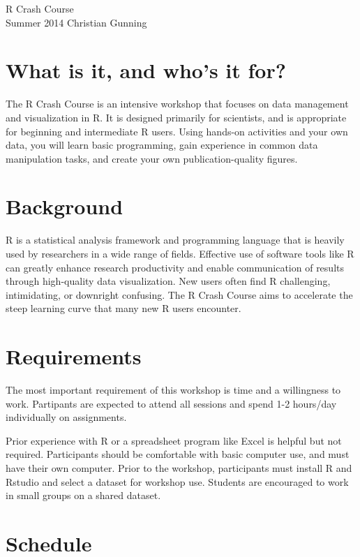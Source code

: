 \documentclass[english, letterpaper, 12pt]{article}
\begin{document}
\begin{center}
\Large{R Crash Course}
~\\
\large{Summer 2014}
\large{Christian Gunning}
~\\
\end{center}
 
\section*{What is it, and who's it for?}
The R Crash Course is an intensive workshop that focuses on data management and
visualization in R.   It is designed primarily for scientists, and is appropriate
for beginning and intermediate R users.   Using hands-on activities and your own
data, you will learn basic programming, gain experience in common data manipulation
tasks, and create your own publication-quality figures.

\section*{Background}
R is a statistical 
 analysis framework and programming language that is heavily used by
researchers in a wide range of fields.
Effective use of software tools like R can greatly enhance
research productivity and enable communication of results
through high-quality data visualization. New users often find R
challenging, intimidating, or downright confusing. 
The R Crash Course aims to accelerate the steep learning curve 
that many new R users encounter.  

\section*{Requirements}
The most important requirement of this workshop is time and a willingness to
work.  Partipants are expected to attend all sessions and spend 1-2 hours/day
individually on assignments.

Prior experience with R or a spreadsheet program like Excel is helpful but not
required.  Participants should be comfortable with basic
computer use, and must have their own computer.  Prior to the workshop, participants
must install R and Rstudio and select a dataset for workshop use.  Students are
encouraged to work in small groups on a shared dataset.

\clearpage
\section*{Schedule}
\end{document}
